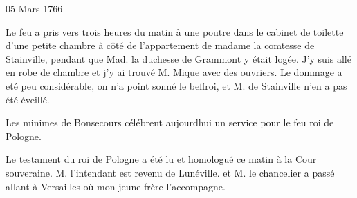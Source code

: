                      \begin{diary}{05 Mars 1766}{}
                        
                         Le feu a pris vers trois heures du
                           matin
                           à une poutre dans le cabinet de toilette
                           d'une petite chambre à côté de l'appartement
                           de madame la comtesse de Stainville, pendant
                           que Mad. la duchesse de
                              Grammont
                           y était logée. J'y suis allé en robe de
                           chambre et j'y ai trouvé M. Mique
                           avec des ouvriers. Le dommage a eté
                           peu considérable, on n'a point sonné
                           le beffroi, et M. de
                              Stainville n'en a
                           pas été éveillé. \bigskip
        
        
                        
                           Les minimes de Bonsecours
                           célébrent
                           aujourdhui un service pour le feu
                              roi de Pologne. \bigskip
        
        
                         Le testament du roi de Pologne a été lu et
                           homologué ce matin à la Cour
                              souveraine.
                           M. l'intendant est revenu de
                              Lunéville.
                           et M. le chancelier a passé
                           allant à
                           Versailles où mon jeune frère
                           l'accompagne. \bigskip
        
        
                     \end{diary}
                     
